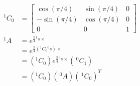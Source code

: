 \begin{solutionbox}[Q1-3]
    \begin{align*}
        {^1C_0} & = \begin{bmatrix}
                        \cos(\pi/4)  & \sin(\pi/4) & 0 \\
                        -\sin(\pi/4) & \cos(\pi/4) & 0 \\
                        0            & 0           & 1
                    \end{bmatrix}                                       \\
        {^1A}   & =e^{\frac{\pi}{4} {^1s}\times}                                         \\
                & =e^{\frac{\pi}{4} ({^1C_0}{^0s})\times}                                \\
                & =\left(^1C_0\right) e^{\frac{\pi}{4} {^0s}\times} \left(\,^0C_1\right) \\
                & =\left(^1C_0\right) \left(\,^0A\right) \left(\,^1C_0\right)^{T}        \\
    \end{align*}
\end{solutionbox}

